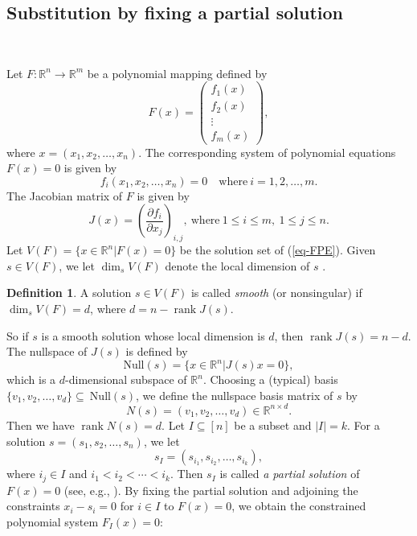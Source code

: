 \documentclass[reqno]{amsart}
\theoremstyle{definition}
\newtheorem{definition}[theorem]{Definition}
\numberwithin{equation}{section}
\theoremstyle{remark}
\begin{document}
\subsection{Substitution by fixing a partial solution}
\


Let $F: \mathbb{R}^n\to \mathbb{R}^m$ be a polynomial mapping defined by 
$$F(x)=
\left(
\begin{array}{c}
f_1(x)\\
f_2(x)\\
\vdots\\
f_m(x)
\end{array}
\right),
$$
where $x=(x_1,x_2,\ldots,x_n)$. The corresponding system of polynomial equations $F(x)=0$ is given by
\begin{equation}\label{eq-FPE}
f_i(x_1,x_2,\ldots,x_n)=0\quad\text{where}~i=1,2,\ldots,m.
\end{equation}
The Jacobian matrix of $F$ is given by 
\begin{equation}\label{eq-jac}
J(x) =\left(\frac{\partial f_i}{\partial x_j}\right)_{i,j},~\text{where}~1\leq i\leq m,~1\leq j\leq n.
\end{equation}
Let $V(F)=\{x\in \mathbb{R}^n|F(x)=0\}$ be the solution set of (\ref{eq-FPE}). Given $s\in V(F)$, we let $\dim_s V(F)$ denote the local dimension of $s$ \cite{cox25,li25def}.  
\begin{definition}\cite{cox25}
A solution $s\in V(F)$ is called \emph{smooth} (or nonsingular) if
$\dim_s V(F)=d$, where $d=n-\operatorname{rank}J(s)$.
\end{definition}
So if $s$ is a smooth solution whose local dimension is $d$, then 
$\operatorname{rank}J(s)=n-d$. The nullspace of $J(s)$ is defined by
$$\mathrm{Null}(s)=\{x\in \mathbb{R}^n| J(s)x=0\},$$
which is a $d$-dimensional subspace of $\mathbb{R}^n$.
Choosing a (typical) basis $\{v_1,v_2,\ldots,v_d\} \subseteq~\mathrm{Null}(s)$, we define the nullspace basis matrix of $s$ by
\begin{equation}\label{eq-ns}
N(s)=(v_1,v_2,\ldots,v_d)\in \mathbb{R}^{n\times d}.
\end{equation}
Then we have $\operatorname{rank}N(s)=d$. Let $I\subseteq [n]$ be a subset and $|I|=k$. For a solution $s=(s_1,s_2,\ldots,s_n)$, we let 
$$s_I=(s_{i_1},s_{i_2},\ldots,s_{i_k}),$$
where $i_j\in I$ and $i_1<i_2<\cdots<i_k$. Then $s_I$ is called \emph{a partial solution} of $F(x)=0$ (see, e.g., \cite{cox25}). By fixing the partial solution and adjoining the constraints $x_i-s_i=0$ for $i\in I$ to $F(x)=0$, we obtain the constrained polynomial system $F_I(x)=0$:
\end{document}
